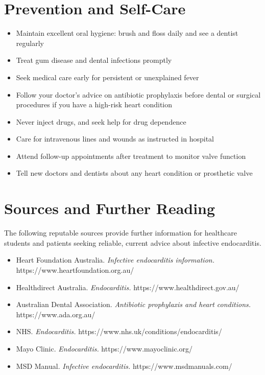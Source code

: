 \section*{Prevention and Self-Care}
\begin{itemize}
    \item Maintain excellent oral hygiene: brush and floss daily and see a dentist regularly
    \item Treat gum disease and dental infections promptly
    \item Seek medical care early for persistent or unexplained fever
    \item Follow your doctor's advice on antibiotic prophylaxis before dental or surgical procedures if you have a high-risk heart condition
    \item Never inject drugs, and seek help for drug dependence
    \item Care for intravenous lines and wounds as instructed in hospital
    \item Attend follow-up appointments after treatment to monitor valve function
    \item Tell new doctors and dentists about any heart condition or prosthetic valve
\end{itemize}

\section*{Sources and Further Reading}
The following reputable sources provide further information for healthcare students and patients seeking reliable, current advice about infective endocarditis.
\begin{itemize}
    \item Heart Foundation Australia. \textit{Infective endocarditis information.} https://www.heartfoundation.org.au/
    \item Healthdirect Australia. \textit{Endocarditis.} https://www.healthdirect.gov.au/
    \item Australian Dental Association. \textit{Antibiotic prophylaxis and heart conditions.} https://www.ada.org.au/
    \item NHS. \textit{Endocarditis.} https://www.nhs.uk/conditions/endocarditis/
    \item Mayo Clinic. \textit{Endocarditis.} https://www.mayoclinic.org/
    \item MSD Manual. \textit{Infective endocarditis.} https://www.msdmanuals.com/
\end{itemize}
